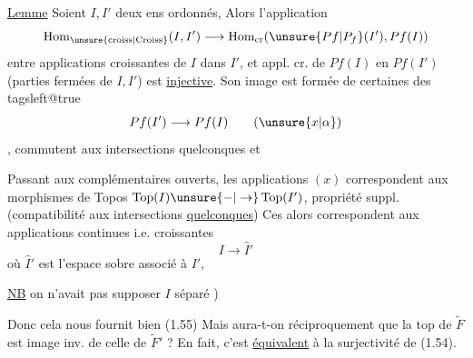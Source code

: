 
\uline{Lemme} Soient $I,I'$ deux ens  ordonnés, Alors l'application
\[
\operatorname{Hom}_{\unsure{\mathrm{croiss}|\mathrm{Croiss}}}(I,I')\longrightarrow
\operatorname{Hom}_{\mathrm{cr}}(\unsure{Pf|P_f}(I'),Pf(I))
\]
entre applications croissantes de $I$ dans $I'$, et appl. cr. de $Pf(I)$ en $Pf(I')$ (parties  fermées de $I,I'$) est \uline{injective}. Son image est formée  de certaines des
\begingroup\csname tagsleft@true\endcsname
\[
Pf(I')\longrightarrow Pf(I)\tag*{$(\unsure{x|\alpha})$}
\]
\endgroup
{}, commutent aux intersections  quelconques \unsure{,} et 

 Passant aux complémentaires ouverts,  les applications $(x)$ correspondent aux  morphismes  de Topos $\operatorname{Top}(I)\unsure{-|\to}\operatorname{Top}(I')$,   propriété suppl. (compatibilité aux intersections \uline{quelconques})  Ces  alors correspondent aux applications continues i.e. croissantes
\[
I\longrightarrow\widehat{I}'
\]
où $\widehat{I}'$ est l'espace sobre associé à $I'$, 

\uline{NB} on n'avait pas  supposer $I$ séparé )  

Donc cela nous fournit bien (1.55)   Mais aura-t-on réciproquement que la top de $\widetilde F$ est image inv. de celle de $\widetilde F'$ ? En fait, c'est \uline{équivalent} à la surjectivité de (1.54).

